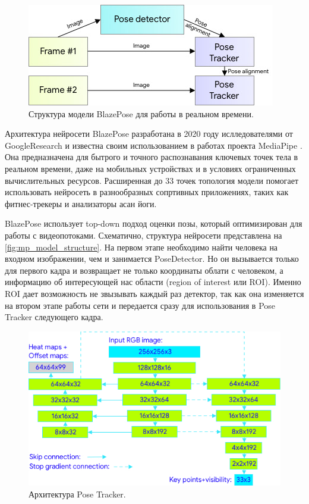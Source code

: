 \begin{figure}[b]
	\centering
	\includegraphics[width=.8\textwidth]{./images/BlazePose/Model_structure.jpg}
	\caption{Структура модели BlazePose для работы в реальном времени. \cite{BlazePose}}
	\label{fig:mp_model_structure}
\end{figure}

Архитектура нейросети BlazePose разработана в 2020 году ислледователями от GoogleResearch и известна своим использованием в работах проекта MediaPipe \cite{BlazePose, mediapipe}. Она предназначена для бытрого и точного распознавания ключевых точек тела в реальном времени, даже на мобильных устройствах и в условиях ограниченных вычислительных ресурсов. Расширенная до 33 точек топология модели помогает использовать нейросеть в разнообразных сопртивных приложениях, таких как фитнес-трекеры и анализаторы асан йоги.

BlazePose использует top-down подход оценки позы, который оптимизирован для работы с видеопотоками. Схематично, структура нейросети представлена на \autoref{fig:mp_model_structure}. На первом этапе необходимо найти человека на входном изображении, чем и занимается PoseDetector. Но он вызывается только для первого кадра и возвращает не только координаты облати с человеком, а информацию об интересующей нас области (region of interest или ROI). Именно ROI дает возможность не звызывать каждый раз детектор, так как она изменяется на втором этапе работы сети и передается сразу для использования в Pose Tracker следующего кадра.

\begin{figure}[h]
	\centering
	\includegraphics[width=.8\textwidth]{./images/BlazePose/architecture.jpg}
	\caption{Архитектура Pose Tracker. \cite{BlazePose}}
	\label{fig:mp_architecture}
\end{figure} 

